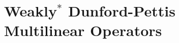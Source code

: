 \documentclass[12 pt]{article}%
\newtheorem{proposition}[theorem]{Proposition}
\newtheorem{final remark}[theorem]{Final Remark}
\newtheorem{definition}[theorem]{Definition}
\begin{document}
%
%
%
%
%
%

\section{Weakly$^{*}$ Dunford-Pettis Multilinear Operators}
\end{document}
